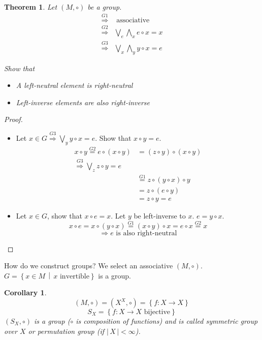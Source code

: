 \documentclass[a4paper,landscape,twocolumn]{article}
\newcommand\set[1]{\left\{#1\right\}}
\newcommand\setdef[2]{\left\{#1\,\middle|\,#2\right\}}
\newcommand\card[1]{\left|\,#1\,\right|}
\newtheorem{theorem}{Theorem}
\newtheorem{cor}{Corollary}
\begin{document}
\begin{theorem}
  \label{satz-2-9}
  Let $(M,\circ)$ be a group.
  \begin{align*}
    \stackrel{G1}{\Rightarrow} & \text{ associative } \\
    \stackrel{G2}{\Rightarrow} & \bigvee_e \bigwedge_x e \circ x = x \\
    \stackrel{G3}{\Rightarrow} & \bigvee_x \bigwedge_y y \circ x = e
  \end{align*}

  Show that
  \begin{itemize}
      \item[i.] A left-neutral element is right-neutral
      \item[ii.] Left-inverse elements are also right-inverse
  \end{itemize}
\end{theorem}

\begin{proof}
  \begin{itemize}
    \item[ii.]
      Let $x \in G \stackrel{G3}{\Rightarrow} \bigvee_y y \circ x = e$.
      Show that $x \circ y = e$.
      \begin{align*}
        x \circ y \stackrel{G2}{=} e \circ (x \circ y) &= (z \circ y) \circ (x \circ y) \\
        \stackrel{G3}{\Rightarrow} \bigvee_{z} z \circ y = e \\
        &\stackrel{G1}{=} z \circ (y \circ x) \circ y \\
        &= z \circ (e \circ y) \\
        &= z \circ y = e
      \end{align*}
    \item[i.]
      Let $x \in G$, show that $x \circ e = x$. Let $y$ be left-inverse to $x$.
      $e = y \circ x$.
      \[ x \circ e = x \circ (y \circ x) \stackrel{G1}{=} (x \circ y) \circ x = e \circ x \stackrel{G2}{=} x \]
      \[ \Rightarrow e \text{ is also right-neutral} \]
  \end{itemize}
\end{proof}

How do we construct groups? We select an associative $(M, \circ)$.
$G = \setdef{x \in M}{x \text{ invertible}}$ is a group.

\begin{cor}
  \[ (M, \circ) = (X^X, \circ) = \set{f: X \rightarrow X} \]
  \[ S_X = \set{f: X \rightarrow X \text{ bijective}} \]
  $(S_X, \circ)$ is a group ($\circ$ is composition of functions)
  and is called \emph{symmetric group} over $X$ or \emph{permutation group} (if $\card{X} < \infty$).
\end{cor}
\end{document}
